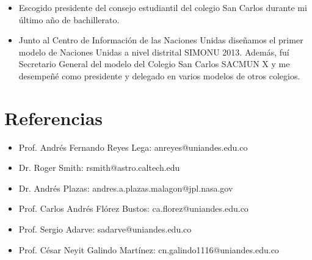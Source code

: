 \documentclass[line,margin]{res}
\begin{document}
\begin{resume}
\begin{itemize}
\item Escogido presidente del consejo estudiantil del colegio San Carlos durante mi último año de bachillerato.

\item Junto al Centro de Información de las Naciones Unidas diseñamos el primer modelo de Naciones Unidas a nivel distrital SIMONU 2013. Además, fuí Secretario General del modelo del Colegio San Carlos SACMUN X y me desempeñé como presidente y delegado en varios modelos de otros colegios.

\end{itemize}  
  
\section{Referencias}  

\begin{itemize}

\item Prof. Andrés Fernando Reyes Lega: anreyes@uniandes.edu.co

\item Dr. Roger Smith: rsmith@astro.caltech.edu 

\item Dr. Andrés Plazas: andres.a.plazas.malagon@jpl.nasa.gov

\item Prof. Carlos Andrés Flórez Bustos: ca.florez@uniandes.edu.co

\item Prof. Sergio Adarve: sadarve@uniandes.edu.co

\item Prof. César Neyit Galindo Martínez: cn.galindo1116@uniandes.edu.co

\end{itemize}
  
\end{resume}
\end{document}
